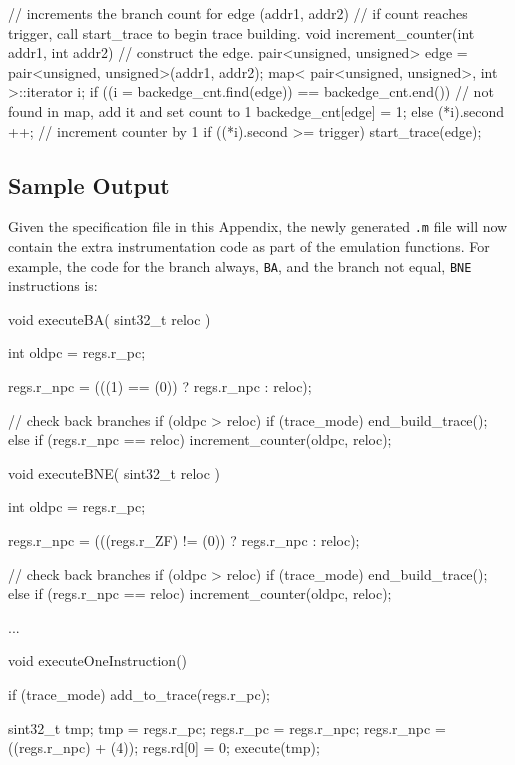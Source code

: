 \begin{smallverbatim}
// increments the branch count for edge (addr1, addr2)
// if count reaches trigger, call start_trace to begin trace building.
void increment_counter(int addr1, int addr2) {
    // construct the edge.
    pair<unsigned, unsigned> edge = 
                       pair<unsigned, unsigned>(addr1, addr2);
    map< pair<unsigned, unsigned>, int >::iterator i;
    if ((i = backedge_cnt.find(edge)) == backedge_cnt.end()) {
        // not found in map, add it and set count to 1
        backedge_cnt[edge] = 1;
    } else {
        (*i).second ++;              // increment counter by 1
        if ((*i).second >= trigger) {
            start_trace(edge);
        }
    }
}
\end{smallverbatim}


\subsection{Sample Output}

Given the specification file in this Appendix, the newly generated 
\texttt{.m} file will now contain the extra instrumentation code as part 
of the emulation functions.  For example, the code for the branch always, 
\texttt{BA}, and the branch not equal, \texttt{BNE} instructions is: 

\begin{smallverbatim}
void executeBA( sint32_t reloc )
{
  int oldpc = regs.r_pc;
  
  regs.r_npc = (((1) == (0)) ? regs.r_npc : reloc);

  // check back branches
  if (oldpc > reloc) {
    if (trace_mode) {
        end_build_trace();
    } else {		
        if (regs.r_npc == reloc) {			
            increment_counter(oldpc, reloc);
        }
    }
  }
}

void executeBNE( sint32_t reloc )
{
  int oldpc = regs.r_pc;

  regs.r_npc = (((regs.r_ZF) != (0)) ? regs.r_npc : reloc);

  // check back branches
  if (oldpc > reloc) {
    if (trace_mode) {
        end_build_trace();
    } else {		
        if (regs.r_npc == reloc) {			
            increment_counter(oldpc, reloc);
        }
    }
  }
}

...

void executeOneInstruction()
{
    if (trace_mode) {
        add_to_trace(regs.r_pc);		
    }

    sint32_t tmp;
    tmp = regs.r_pc;
    regs.r_pc = regs.r_npc;
    regs.r_npc = ((regs.r_npc) + (4));
    regs.rd[0] = 0;
    execute(tmp);
}
\end{smallverbatim}


